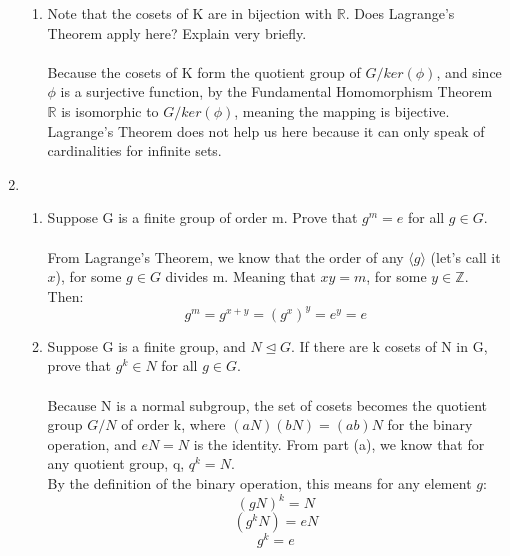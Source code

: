 \begin{enumerate}
\begin{enumerate}
      \item Note that the cosets of K are in bijection with $\mathds{R}$. Does Lagrange's Theorem apply here? Explain very briefly.\\\\

      Because the cosets of K form the quotient group of $G/ker(\phi)$, and since $\phi$ is a surjective function, by the Fundamental Homomorphism Theorem $\mathds{R}$ is isomorphic to $G/ker(\phi)$, meaning the mapping is bijective. Lagrange's Theorem does not help us here because it can only speak of cardinalities for infinite sets.\\
      
      \end{enumerate}

\item
        \begin{enumerate}
        \item Suppose G is a finite group of order m. Prove that $g^m=e$ for all $g \in G$.\\\\

        From Lagrange's Theorem, we know that the order of any $\langle g \rangle$ (let's call it $x$), for some $g \in G$ divides m. Meaning that $xy = m$, for some $y \in \mathds{Z}$. Then:
        $$g^m = g^{x+y} = (g^x)^y = e^y = e$$

        \item Suppose G is a finite group, and $N \trianglelefteq G$. If there are k cosets of N in G, prove that $g^k \in N$ for all $g \in G$.\\\\

        Because N is a normal subgroup, the set of cosets becomes the quotient group $G/N$ of order k, where $(aN)(bN)=(ab)N$ for the binary operation, and $eN=N$ is the identity. From part (a), we know that for any quotient group, q, $q^k=N$.\\
        By the definition of the binary operation, this means for any element $g$:
        $$(gN)^k=N$$
        $$(g^kN)=eN$$
        $$g^k=e$$
        \end{enumerate}


\end{enumerate}
